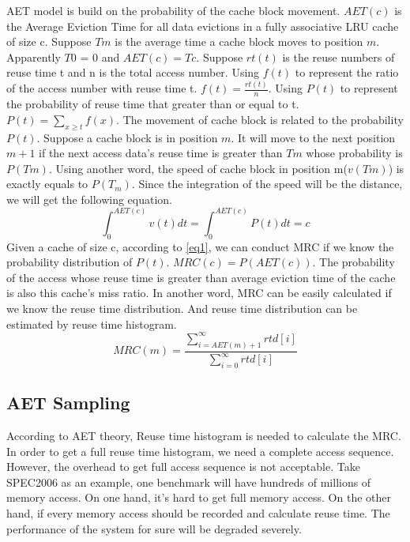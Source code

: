 \documentclass[10pt,twocolumn]{article}
\begin{document}
AET model is build on the probability of the cache block movement. $AET(c)$ is the Average Eviction Time for all data evictions in a fully associative LRU cache of size c. Suppose $Tm$ is the average time a cache block moves to position $m$. Apparently $T0$ = 0 and $AET(c) = Tc$. Suppose $rt(t)$ is the reuse numbers of reuse time t and n is the total access number. Using $f(t)$ to represent the ratio of the access number with reuse time t. $f(t) = \frac{rt(t)}{n}$. Using $P(t)$ to represent the probability of reuse time that greater than or equal to t. $P(t) = \sum\nolimits_{x \geq t}f(x)$. The movement of cache block is related to the probability $P(t)$. Suppose a cache block is in position $m$. It will move to the next position $m + 1$ if the next access data's reuse time is greater than $Tm$ whose probability is $P(Tm)$. Using another word, the speed of cache block in position m($v(Tm)$) is exactly equals to $P(T_m)$. Since the integration of the speed will be the distance, we will get the following equation.
\begin{equation}\label{eq1}
\int_{0}^{AET(c)}v(t)dt=\int_{0}^{AET(c)}P(t)dt=c
\end{equation}
Given a cache of size c, according to \ref{eq1}, we can conduct MRC if we know the probability distribution of $P(t)$. $MRC(c) = P(AET(c))$. The probability of the access whose reuse time is greater than average eviction time of the cache is also this cache's miss ratio. In another word, MRC can be easily calculated if we know the reuse time distribution. And reuse time distribution can be estimated by reuse time histogram.
\begin{equation}
MRC(m) = \frac{\sum\nolimits_{i=AET(m)+1}^{\infty} rtd[i]}   {\sum\nolimits_{i=0}^{\infty} rtd[i]}
\end{equation}

\subsection{AET Sampling}
According to AET theory, Reuse time histogram is needed to calculate the MRC. In order to get a full reuse time histogram, we need a complete access sequence. However, the overhead to get full access sequence is not acceptable. Take SPEC2006 as an example, one benchmark will have hundreds of millions of memory access. On one hand, it's hard to get full memory access. On the other hand, if every memory access should be recorded and calculate reuse time. The performance of the system for sure will be degraded severely.
\end{document}
